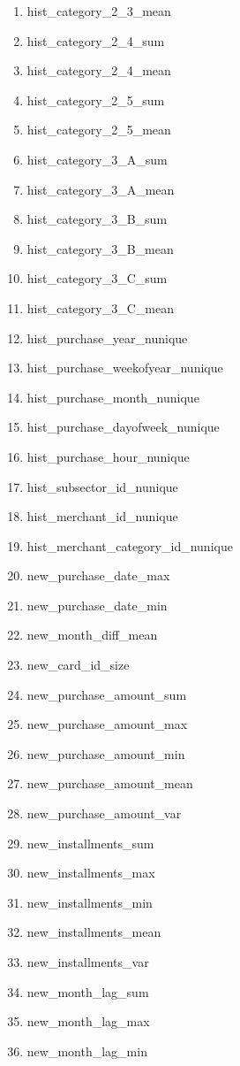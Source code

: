 \documentclass{article}
\begin{document}
\begin{enumerate}
\item hist\_category\_2\_3\_mean
\item hist\_category\_2\_4\_sum
\item hist\_category\_2\_4\_mean
\item hist\_category\_2\_5\_sum
\item hist\_category\_2\_5\_mean
\item hist\_category\_3\_A\_sum
\item hist\_category\_3\_A\_mean
\item hist\_category\_3\_B\_sum
\item hist\_category\_3\_B\_mean
\item hist\_category\_3\_C\_sum
\item hist\_category\_3\_C\_mean
\item hist\_purchase\_year\_nunique
\item hist\_purchase\_weekofyear\_nunique
\item hist\_purchase\_month\_nunique
\item hist\_purchase\_dayofweek\_nunique
\item hist\_purchase\_hour\_nunique
\item hist\_subsector\_id\_nunique
\item hist\_merchant\_id\_nunique
\item hist\_merchant\_category\_id\_nunique
\item new\_purchase\_date\_max
\item new\_purchase\_date\_min
\item new\_month\_diff\_mean
\item new\_card\_id\_size
\item new\_purchase\_amount\_sum
\item new\_purchase\_amount\_max
\item new\_purchase\_amount\_min
\item new\_purchase\_amount\_mean
\item new\_purchase\_amount\_var
\item new\_installments\_sum
\item new\_installments\_max
\item new\_installments\_min
\item new\_installments\_mean
\item new\_installments\_var
\item new\_month\_lag\_sum
\item new\_month\_lag\_max
\item new\_month\_lag\_min

\end{enumerate}
\end{document}
